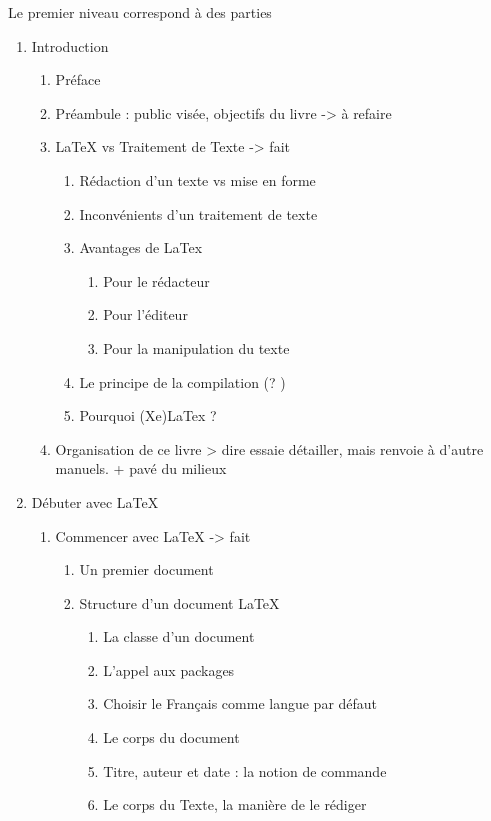 Le premier niveau correspond à des parties
\begin{enumerate}
\item Introduction
	
	\begin{enumerate}
	\item Préface
	\item Préambule : public visée, objectifs du livre			-> à refaire
	\item LaTeX vs Traitement de Texte					-> fait
		\begin{enumerate}
		\item Rédaction d'un texte vs mise en forme
		\item Inconvénients d'un traitement de texte
		\item Avantages de LaTex
		\begin{enumerate}
			\item Pour le rédacteur
			\item Pour l'éditeur
			\item Pour la manipulation du texte
		\end{enumerate}
		\item Le principe de la compilation  (? )
		\item Pourquoi (Xe)LaTex ?
		\end{enumerate}
	\item Organisation de ce livre						> dire essaie détailler, mais renvoie à d'autre manuels. + pavé du milieux
	\end{enumerate}
\item Débuter avec LaTeX
\begin{enumerate}
	\item Commencer avec LaTeX						-> fait
	\begin{enumerate}
		\item Un premier document
		\item Structure d'un document LaTeX
		\begin{enumerate}
			\item La classe d'un document
			\item L'appel aux packages
			\item Choisir le Français comme langue par défaut
			\item Le corps du document
			\item Titre, auteur et date : la notion de commande
			\item Le corps du Texte, la manière de le rédiger

\end{enumerate}
\end{enumerate}
\end{enumerate}
\end{enumerate}
